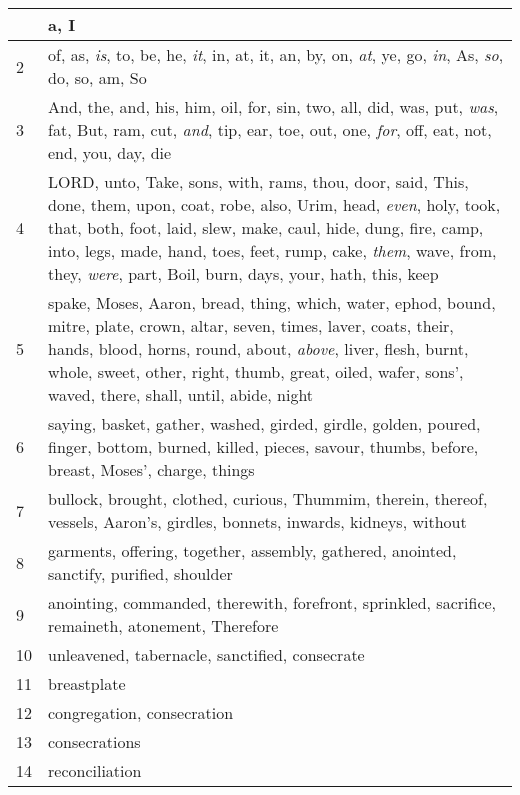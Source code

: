 \begin{longtable}{l|p{3.75in}}
\hline \hline
\endlastfoot
1 & a, I \\ \hline
2 & of, as, \emph{is}, to, be, he, \emph{it}, in, at, it, an, by, on, \emph{at}, ye, go, \emph{in}, As, \emph{so}, do, so, am, So \\ \hline
3 & And, the, and, his, him, oil, for, sin, two, all, did, was, put, \emph{was}, fat, But, ram, cut, \emph{and}, tip, ear, toe, out, one, \emph{for}, off, eat, not, end, you, day, die \\ \hline
4 & LORD, unto, Take, sons, with, rams, thou, door, said, This, done, them, upon, coat, robe, also, Urim, head, \emph{even}, holy, took, that, both, foot, laid, slew, make, caul, hide, dung, fire, camp, into, legs, made, hand, toes, feet, rump, cake, \emph{them}, wave, from, they, \emph{were}, part, Boil, burn, days, your, hath, this, keep \\ \hline
5 & spake, Moses, Aaron, bread, thing, which, water, ephod, bound, mitre, plate, crown, altar, seven, times, laver, coats, their, hands, blood, horns, round, about, \emph{above}, liver, flesh, burnt, whole, sweet, other, right, thumb, great, oiled, wafer, sons', waved, there, shall, until, abide, night \\ \hline
6 & saying, basket, gather, washed, girded, girdle, golden, poured, finger, bottom, burned, killed, pieces, savour, thumbs, before, breast, Moses', charge, things \\ \hline
7 & bullock, brought, clothed, curious, Thummim, therein, thereof, vessels, Aaron's, girdles, bonnets, inwards, kidneys, without \\ \hline
8 & garments, offering, together, assembly, gathered, anointed, sanctify, purified, shoulder \\ \hline
9 & anointing, commanded, therewith, forefront, sprinkled, sacrifice, remaineth, atonement, Therefore \\ \hline
10 & unleavened, tabernacle, sanctified, consecrate \\ \hline
11 & breastplate \\ \hline
12 & congregation, consecration \\ \hline
13 & consecrations \\ \hline
14 & reconciliation \\ \hline
\end{longtable}






 



